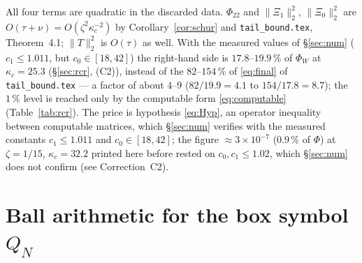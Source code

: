 \documentclass[11pt]{article}
\begin{document}

\begin{remark}
All four terms are quadratic in the discarded data.  $\Phi_{22}$ and $\|\Xi_1\|_2^2$, $\|\Xi_0\|_2^2$
are $O(\tau+\nu)=O(\zeta^2\kappa_c^{-2})$ by Corollary~\ref{cor:schur} and
\texttt{tail\_bound.tex}, Theorem~4.1; $\|T\|_2^2$ is $O(\tau)$ as well.  With the measured values of
\S\ref{sec:num} ($c_1\le1.011$, but $c_0\in[18,42]$) the right-hand side is $17.8$--$19.9\,\%$ of $\Phi_W$ at $\kappa_c=25.3$ (\S\ref{sec:rcr}, (C2)),
instead of the $82$--$154\,\%$ of \eqref{eq:final} of \texttt{tail\_bound.tex} --- a factor of about $4$--$9$ ($82/19.9=4.1$ to $154/17.8=8.7$);
the $1\,\%$ level is reached only by the computable form \eqref{eq:computable} (Table~\ref{tab:rcr}).  The price is hypothesis \eqref{eq:Hyp}, an operator inequality between
computable matrices, which \S\ref{sec:num} verifies with the measured constants $c_1\le1.011$ and $c_0\in[18,42]$; the figure $\approx3\times10^{-7}$ ($0.9\,\%$ of $\Phi$) at $\zeta=1/15$, $\kappa_c=32.2$ printed here before rested on $c_0,c_1\le1.02$, which \S\ref{sec:num} does not confirm (see Correction~C2).
\end{remark}
\section{Ball arithmetic for the box symbol $Q_N$}\label{sec:ball}\label{sec:qbox}
\end{document}
